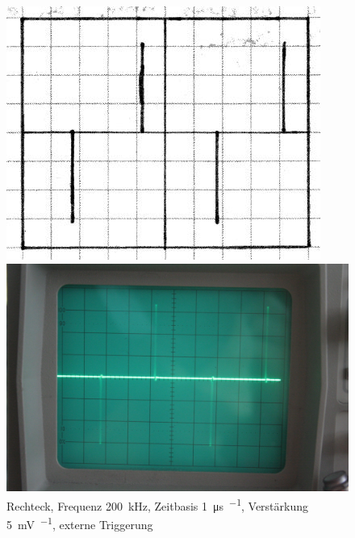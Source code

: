 \begin{figure}[htbp]
	\centering
	\begin{minipage}{.45\linewidth}
	\includegraphics[width=\linewidth]{Skizzen/IMG_0752-1500.jpg}
	\end{minipage}
	\hfill
	\begin{minipage}{.45\linewidth}
	\includegraphics[width=\linewidth]{Fotos/IMG_0752-1500.jpg}
	\end{minipage}
	\caption{%
		Rechteck, Frequenz \SI{200}{\kilo\hertz}, Zeitbasis \SI{1}{\micro\second\per\division}, Verstärkung \SI{5}{\milli\volt\per\division}, externe Triggerung
	}
	\label{fig:0752}
\end{figure}

